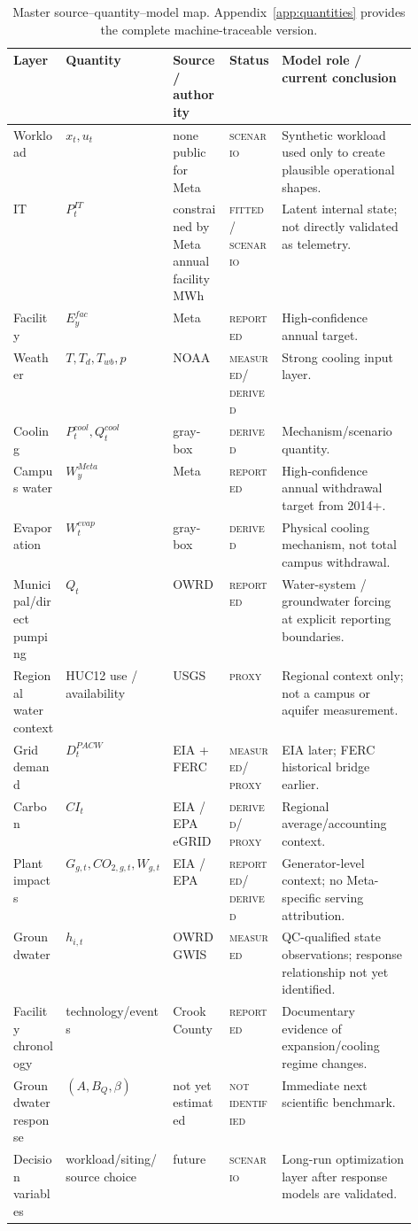 \documentclass[11pt]{article}
\newcommand{\Reported}{\textsc{reported}}
\newcommand{\Measured}{\textsc{measured}}
\newcommand{\Derived}{\textsc{derived}}
\newcommand{\Fitted}{\textsc{fitted}}
\newcommand{\Proxy}{\textsc{proxy}}
\newcommand{\Scenario}{\textsc{scenario}}
\newcommand{\NotIdentified}{\textsc{not identified}}
\begin{document}
\begin{table}[ht]
\centering
\scriptsize
\begin{tabularx}{\linewidth}{@{}p{0.13\linewidth}p{0.13\linewidth}p{0.14\linewidth}p{0.13\linewidth}Y@{}}
\toprule
\textbf{Layer} & \textbf{Quantity} & \textbf{Source / authority} & \textbf{Status} & \textbf{Model role / current conclusion} \\
\midrule
Workload & \(x_t,u_t\) & none public for Meta & \Scenario & Synthetic workload used only to create plausible operational shapes. \\
IT & \(P^{IT}_t\) & constrained by Meta annual facility MWh & \Fitted / \Scenario & Latent internal state; not directly validated as telemetry. \\
Facility & \(E^{fac}_y\) & Meta & \Reported & High-confidence annual target. \\
Weather & \(T,T_d,T_{wb},p\) & NOAA & \Measured / \Derived & Strong cooling input layer. \\
Cooling & \(P^{cool}_t,Q^{cool}_t\) & gray-box & \Derived & Mechanism/scenario quantity. \\
Campus water & \(W^{Meta}_y\) & Meta & \Reported & High-confidence annual withdrawal target from 2014+. \\
Evaporation & \(W^{evap}_t\) & gray-box & \Derived & Physical cooling mechanism, not total campus withdrawal. \\
Municipal/direct pumping & \(Q_t\) & OWRD & \Reported & Water-system / groundwater forcing at explicit reporting boundaries. \\
Regional water context & HUC12 use / availability & USGS & \Proxy & Regional context only; not a campus or aquifer measurement. \\
Grid demand & \(D^{PACW}_t\) & EIA + FERC & \Measured / \Proxy & EIA later; FERC historical bridge earlier. \\
Carbon & \(CI_t\) & EIA / EPA eGRID & \Derived / \Proxy & Regional average/accounting context. \\
Plant impacts & \(G_{g,t},CO_{2,g,t},W_{g,t}\) & EIA / EPA & \Reported / \Derived & Generator-level context; no Meta-specific serving attribution. \\
Groundwater & \(h_{i,t}\) & OWRD GWIS & \Measured & QC-qualified state observations; response relationship not yet identified. \\
Facility chronology & technology/events & Crook County & \Reported & Documentary evidence of expansion/cooling regime changes. \\
Groundwater response & \((A,B_Q,\beta)\) & not yet estimated & \NotIdentified & Immediate next scientific benchmark. \\
Decision variables & workload/siting/source choice & future & \Scenario & Long-run optimization layer after response models are validated. \\
\bottomrule
\end{tabularx}
\caption{Master source--quantity--model map. Appendix~\ref{app:quantities} provides the complete machine-traceable version.}
\end{table}
\end{document}
